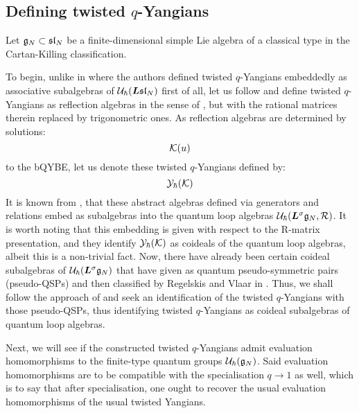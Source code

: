     \subsection{\texorpdfstring{Defining twisted $q$-Yangians}{}}
        Let $\mathfrak{g}_N \subset \mathfrak{sl}_N$ be a finite-dimensional simple Lie algebra of a classical type in the Cartan-Killing classification.
    
        To begin, unlike in \cite{molev_ragoucy_sorba_twisted_q_yangians_type_A} where the authors defined twisted $q$-Yangians embeddedly as associative subalgebras of $\mathcal{U}_{\hbar}(\boldsymbol{L}\mathfrak{sl}_N)$ first of all, let us follow \cite{regelskis_vlaar_reflection_matrices_coideal_subalgebras} and define twisted $q$-Yangians as reflection algebras in the sense of \cite{guay_regelskis_twisted_yangians_for_symmetric_pairs_of_types_BCD}, but with the rational matrices therein replaced by trigonometric ones. As reflection algebras are determined by solutions:
            $$\mathcal{K}(u)$$
        to the bQYBE, let us denote these twisted $q$-Yangians defined by:
            $$\mathcal{Y}_{\hbar}(\mathcal{K})$$
        It is known from \cite[Subsection 10.2]{regelskis_vlaar_reflection_matrices_coideal_subalgebras}, that these abstract algebras defined via generators and relations embed as subalgebras into the quantum loop algebras $\mathcal{U}_{\hbar}(\boldsymbol{L}^{\sigma}\mathfrak{g}_N, \mathcal{R})$. It is worth noting that this embedding is given with respect to the R-matrix presentation, and they identify $\mathcal{Y}_{\hbar}(\mathcal{K})$ as coideals of the quantum loop algebras, albeit this is a non-trivial fact. Now, there have already been certain coideal subalgebras of $\mathcal{U}_{\hbar}(\boldsymbol{L}^{\sigma}\mathfrak{g}_N)$ that have given as quantum pseudo-symmetric pairs (pseudo-QSPs) and then classified by Regelskis and Vlaar in \cite[Section 8]{regelskis_vlaar_reflection_matrices_coideal_subalgebras}. Thus, we shall follow the approach of \cite{guay_regelskis_twisted_yangians_for_symmetric_pairs_of_types_BCD} and seek an identification of the twisted $q$-Yangians with those pseudo-QSPs, thus identifying twisted $q$-Yangians as coideal subalgebras of quantum loop algebras.

        Next, we will see if the constructed twisted $q$-Yangians admit evaluation homomorphisms to the finite-type quantum groups $\mathcal{U}_{\hbar}(\mathfrak{g}_N)$. Said evaluation homomorphisms are to be compatible with the specialisation $q \to 1$ as well, which is to say that after specialisation, one ought to recover the usual evaluation homomorphisms of the usual twisted Yangians.